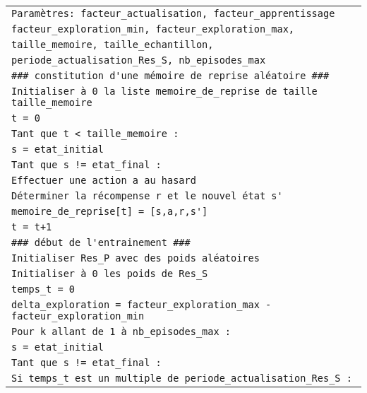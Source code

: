 \begin{tabular}{|l|}
	\hline
	\verb|Paramètres: facteur_actualisation, facteur_apprentissage| \\
	\phantom{|Paramètres:| } \verb|facteur_exploration_min, facteur_exploration_max,| \\
	\phantom{|Paramètres:| } \verb|taille_memoire, taille_echantillon,| \\
	\phantom{|Paramètres:| } \verb|periode_actualisation_Res_S, nb_episodes_max|\\
	\verb|### constitution d'une mémoire de reprise aléatoire ###| \\
	\verb|Initialiser à 0 la liste memoire_de_reprise de taille taille_memoire|\\	
	\verb|t = 0| \\
	\verb|Tant que t < taille_memoire :| \\
	\hspace{0.5cm} \verb|s = etat_initial| \\
	\hspace{0.5cm} \verb|Tant que s != etat_final :| \\
	\hspace{1cm} \verb|Effectuer une action a au hasard| \\
	\hspace{1cm} \verb|Déterminer la récompense r et le nouvel état s'| \\
	\hspace{1cm} \verb|memoire_de_reprise[t] = [s,a,r,s']| \\
	\hspace{1cm} \verb|t = t+1|\\
	\verb|### début de l'entrainement ###| \\
	\verb|Initialiser Res_P avec des poids aléatoires| \\
	\verb|Initialiser à 0 les poids de Res_S| \\
	\verb|temps_t = 0| \\
	\verb|delta_exploration = facteur_exploration_max - facteur_exploration_min| \\
	\verb|Pour k allant de 1 à nb_episodes_max :|\\
	\hspace{0.5cm} \verb|s = etat_initial|\\
	\hspace{0.5cm} \verb|Tant que s != etat_final :| \\
	\hspace{1cm} \verb|Si temps_t est un multiple de periode_actualisation_Res_S :|\\

\end{tabular}
